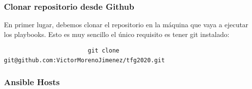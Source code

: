 			\subsubsection{Clonar repositorio desde Github}
				\begin{paragraph}
					En primer lugar, debemos clonar el repositorio en la máquina que vaya a ejecutar los playbooks. Esto es muy sencillo el único requisito es tener git instalado:
					
					\lstset{language=Bash}
					\begin{lstlisting}
						git clone git@github.com:VictorMorenoJimenez/tfg2020.git
					\end{lstlisting}
					 
				\end{paragraph}
			\subsubsection{Ansible Hosts}
